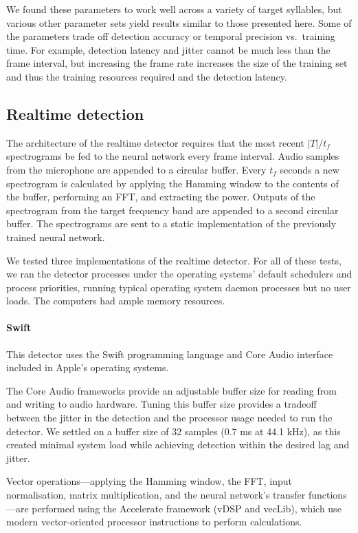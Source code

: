 \documentclass[10pt,letterpaper]{article}
\renewcommand{\subsubsection}[1]{\paragraph{#1}}
\begin{document}
We found these parameters to work well across a variety of target
syllables, but various other parameter sets yield results similar to those
presented here.  Some of the parameters trade off detection accuracy
or temporal precision vs.~training time. For example, detection latency
and jitter cannot be much less than the frame interval, but increasing the
frame rate increases the size of the training set and thus the
training resources required and the detection latency.

\subsection{Realtime detection}

The architecture of the realtime detector requires that the most
recent $|T|/t_f$ spectrograms be fed to the neural network every
frame interval.  Audio samples from the microphone
are appended to a circular buffer.  Every $t_f$ seconds a new
spectrogram is calculated by applying the Hamming window to the
contents of the buffer, performing an FFT, and extracting the
power. Outputs of the spectrogram from the target frequency band are
appended to a second circular buffer.  The spectrograms are sent to a
static implementation of the previously trained neural network.

We tested three implementations of the realtime detector.  For all of
these tests, we ran the detector processes under the operating
systems' default schedulers and process priorities, running typical
operating system daemon processes but no user loads.  The computers
had ample memory resources.

\subsubsection{Swift}

This detector uses the Swift programming language and Core Audio
interface included in Apple's operating systems.

The Core Audio frameworks provide an adjustable buffer size for 
reading from and writing to audio hardware. Tuning this buffer size
provides a tradeoff between the jitter in the detection and the 
processor usage needed to run the detector. We settled on a buffer 
size of 32 samples (0.7 ms at 44.1 kHz), as this created minimal system
load while achieving detection within the desired lag and jitter.

Vector operations---applying the Hamming window, the FFT, input
normalisation, matrix multiplication, and the neural network's
transfer functions---are performed using the Accelerate framework (vDSP
and vecLib), which use modern vector-oriented processor instructions
to perform calculations.
\end{document}
